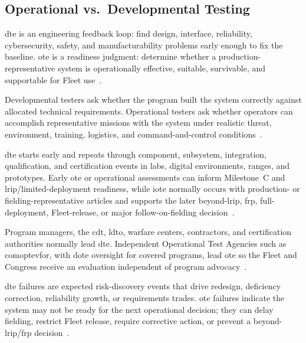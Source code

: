 \documentclass[../main.tex]{subfiles}
\begin{document}
\subsection{Operational vs.\ Developmental Testing}
\begin{description}[style=nextline,labelsep=0.5em,font=\bfseries]
  \item[\textbf{Purpose.}] \ac{dte} is an engineering feedback loop: find design, interface, reliability, cybersecurity, safety, and manufacturability problems early enough to fix the baseline. \ac{ote} is a readiness judgment: determine whether a production-representative system is operationally effective, suitable, survivable, and supportable for Fleet use~\autocite{DoDI5000-89,edo-3-5-6-test-eval-part-ii-2025}.
  \item[\textbf{Primary question.}] Developmental testers ask whether the program built the system correctly against allocated technical requirements. Operational testers ask whether operators can accomplish representative missions with the system under realistic threat, environment, training, logistics, and command-and-control conditions~\autocite{DoDI5000-02}.
  \item[\textbf{Timing and environment.}] \ac{dte} starts early and repeats through component, subsystem, integration, qualification, and certification events in labs, digital environments, ranges, and prototypes. Early \ac{ote} or operational assessments can inform Milestone~C and \ac{lrip}/limited-deployment readiness, while \ac{iote} normally occurs with production- or fielding-representative articles and supports the later beyond-\ac{lrip}, \ac{frp}, full-deployment, Fleet-release, or major follow-on-fielding decision~\autocite{DoDI5000-85,DoDI5000-98,USC-10-4171}.
  \item[\textbf{Who leads.}] Program managers, the \ac{cdt}, \ac{ldto}, warfare centers, contractors, and certification authorities normally lead \ac{dte}. Independent Operational Test Agencies such as \ac{comoptevfor}, with \ac{dote} oversight for covered programs, lead \ac{ote} so the Fleet and Congress receive an evaluation independent of program advocacy~\autocite{DoDI5000-89,USC-10-139}.
  \item[\textbf{Evidence and failure meaning.}] \ac{dte} failures are expected risk-discovery events that drive redesign, deficiency correction, reliability growth, or requirements trades. \ac{ote} failures indicate the system may not be ready for the next operational decision; they can delay fielding, restrict Fleet release, require corrective action, or prevent a beyond-\ac{lrip}/\ac{frp} decision~\autocite{USC-10-4171,edo-3-5-6-test-eval-part-ii-2025}.
\end{description}
\end{document}
